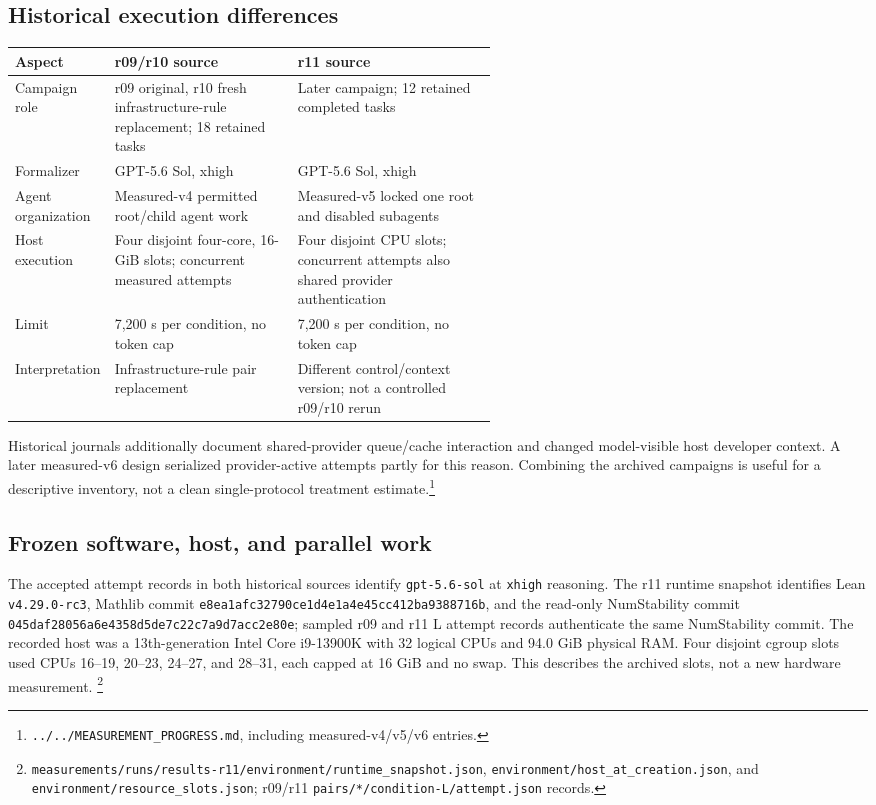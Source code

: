 \documentclass[10pt]{article}
\newcommand{\pathref}[1]{\nolinkurl{#1}}
\begin{document}
\subsection*{Historical execution differences}
\begin{center}\small
\begin{tabularx}{0.98\linewidth}{@{}p{0.18\linewidth}p{0.38\linewidth}X@{}}\toprule
Aspect & r09/r10 source & r11 source \\\midrule
Campaign role & r09 original, r10 fresh infrastructure-rule replacement; 18 retained tasks & Later campaign; 12 retained completed tasks \\
Formalizer & GPT-5.6 Sol, xhigh & GPT-5.6 Sol, xhigh \\
Agent organization & Measured-v4 permitted root/child agent work & Measured-v5 locked one root and disabled subagents \\
Host execution & Four disjoint four-core, 16-GiB slots; concurrent measured attempts & Four disjoint CPU slots; concurrent attempts also shared provider authentication \\
Limit & 7,200 s per condition, no token cap & 7,200 s per condition, no token cap \\
Interpretation & Infrastructure-rule pair replacement & Different control/context version; not a controlled r09/r10 rerun \\
\bottomrule\end{tabularx}
\end{center}
Historical journals additionally document shared-provider queue/cache interaction and changed model-visible host developer context. A later measured-v6 design serialized provider-active attempts partly for this reason. Combining the archived campaigns is useful for a descriptive inventory, not a clean single-protocol treatment estimate.\footnote{\pathref{../../MEASUREMENT_PROGRESS.md}, including measured-v4/v5/v6 entries.}

\subsection*{Frozen software, host, and parallel work}
The accepted attempt records in both historical sources identify
\texttt{gpt-5.6-sol} at \texttt{xhigh} reasoning. The r11 runtime snapshot
identifies Lean \texttt{v4.29.0-rc3}, Mathlib commit
\texttt{e8ea1afc32790ce1d4e1a4e45cc412ba9388716b}, and the read-only
NumStability commit \texttt{045daf28056a6e4358d5de7c22c7a9d7acc2e80e};
sampled r09 and r11 L attempt records authenticate the same NumStability
commit. The recorded host was a 13th-generation Intel Core i9-13900K with
32 logical CPUs and 94.0 GiB physical RAM. Four disjoint cgroup slots used
CPUs 16--19, 20--23, 24--27, and 28--31, each capped at 16 GiB and no swap.
This describes the archived slots, not a new hardware measurement.
\footnote{\pathref{measurements/runs/results-r11/environment/runtime_snapshot.json},
\pathref{environment/host_at_creation.json}, and
\pathref{environment/resource_slots.json}; r09/r11
\pathref{pairs/*/condition-L/attempt.json} records.}
\end{document}

